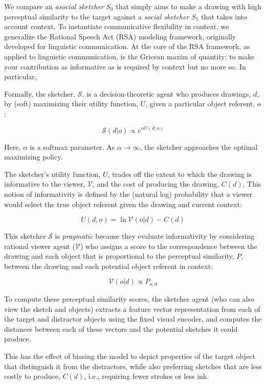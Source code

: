 \documentclass[9pt,twocolumn,twoside]{pnas-new}
\begin{document}
{We compare an \emph{asocial sketcher} $S_0$ that simply aims to make a drawing with high perceptual similarity to the target against a \emph{social sketcher} $S_1$ that takes into account context. To instantiate communicative flexibility in context, we generalize the Rational Speech Act (RSA) modeling framework, originally developed for linguistic communication. At the core of the RSA framework, as applied to linguistic communication, is the Gricean maxim of quantity: to make your contribution as informative as is required by context but no more so. In particular,

Formally, the sketcher, $\mathcal{S}$, is a decision-theoretic agent who produces drawings, $d$, by (soft) maximizing their utility function, $U$, given a particular object referent, $o$:

\begin{equation}
\mathcal{S}(d|o) \propto e^{\alpha U(d,o)}
\end{equation}

Here, $\alpha$ is a softmax parameter. As $\alpha \rightarrow \infty$, the sketcher approaches the optimal maximizing policy.

The sketcher's utility function, $U$, trades off the extent to which the drawing is informative to the viewer, $\mathcal{V}$, and the cost of producing the drawing, $C(d)$. This notion of informativity is defined by the (natural log) probability that a viewer would select the true object referent given the drawing and current context:

\begin{equation} \label{sketcher_utility}
U(d, o) = \ln \mathcal{V}(o|d) - C(d)
\end{equation}

This sketcher $\mathcal{S}$ is \emph{pragmatic} because they evaluate informativity by considering rational viewer agent ($\mathcal{V}$) who assigns a score to the correspondence between the drawing and each object that is proportional to the perceptual similarity, $P$, between the drawing and each potential object referent in context:

\begin{equation} \label{literal_viewer_score}
\mathcal{V}(o|d) \propto P_{o,d}
\end{equation}

To compute these perceptual similarity scores, the sketcher agent (who can also view the sketch and objects) extracts a feature vector representation from each of the target and distractor objects using the fixed visual encoder, and computes the distances between each of these vectors and the potential sketches it could produce.

This has the effect of biasing the model to depict properties of the target object that distinguish it from the distractors, while also preferring sketches that are less costly to produce, $C(d)$, i.e., requiring fewer strokes or less ink.

}
\end{document}

